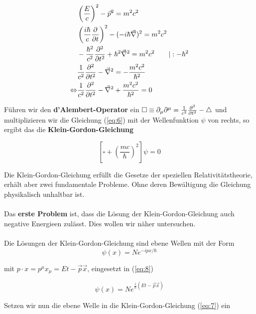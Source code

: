 \begin{align}
  \label{eq:6}
   &\left( \frac{E}{c}\right)^2 -\vec p^2  = m^2c^2 \notag \\
&\left( \frac{ i\hbar }{c}\pdiff_t\right)^2 -(-i\hbar \vec\nabla)^2  = m^2c^2 \notag \\
&- \frac{\hbar^2 }{c^2}\pdiff^2_{t} + \hbar^2 \vec\nabla^2  = m^2c^2  \qquad | :-\hbar^2 \notag \\
&\frac{1 }{c^2}\pdiff^2_{t} - \vec\nabla^2  = - \frac{m^2c^2}{\hbar^2} \notag \\
\Leftrightarrow &\frac{1 }{c^2}\pdiff^2_{t} - \vec\nabla^2 + \frac{m^2c^2}{\hbar^2} = 0
\end{align}

Führen wir den \textbf{d'Alembert-Operator} ein \(\square \equiv \partial_\mu\partial^\mu = \frac{1}{c^2}\pdiff^2_t - \triangle \) und multiplizieren wir die Gleichung (\ref{eq:6}) mit der Wellenfunktion \(\psi\) von rechts, so ergibt das die \textbf{Klein-Gordon-Gleichung}

\begin{equation}
  \label{eq:7}
 \boxed{\left[  \square + \left(\frac{mc}{\hbar}\right)^2\right]\psi  = 0 }
\end{equation}


Die Klein-Gordon-Gleichung erfüllt die Gesetze der speziellen Relativitätstheorie, erhält aber zwei fundamentale Probleme. Ohne deren Bewältigung die Gleichung physikalisch unhaltbar ist. \\
\\
Das \textbf{erste Problem} ist, dass die Lösung der Klein-Gordon-Gleichung auch negative Energieen zulässt. Dies wollen wir näher untersuchen.\\
\\
Die Lösungen der  Klein-Gordon-Gleichung sind ebene Wellen mit der Form
\begin{equation}
  \label{eq:8}
\psi(x) = Ne^{-ipx/\hbar}  
\end{equation}

mit \(p\cdot x = p^\mu x_\mu = Et - \vec p\vec x\), eingesetzt in (\ref{eq:8})

\begin{equation}
  \label{eq:9}
  \psi(x) = Ne^{\frac{i}{\hbar}(Et - \vec p\vec x)}
\end{equation}

Setzen wir nun die ebene Welle in die Klein-Gordon-Gleichung (\ref{eq:7})  ein

